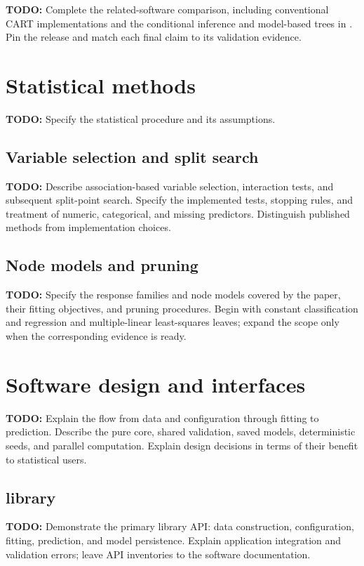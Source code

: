 \documentclass[article]{jss}
\newcommand{\todo}[1]{\textbf{TODO:} #1}
\begin{document}
\todo{Complete the related-software comparison, including conventional CART
implementations and the conditional inference and model-based trees in
\pkg{partykit} \citep{Hothorn+Zeileis:2015}. Pin the release and match each
final claim to its validation evidence.}

\section{Statistical methods}\label{sec:methods}

\todo{Specify the statistical procedure and its assumptions.}

\subsection{Variable selection and split search}
\todo{Describe association-based variable selection, interaction tests,
and subsequent split-point search. Specify the implemented tests, stopping
rules, and treatment of numeric, categorical, and missing predictors.
Distinguish published methods from implementation choices.}

\subsection{Node models and pruning}
\todo{Specify the response families and node models covered by the paper,
their fitting objectives, and pruning procedures. Begin with constant
classification and regression and multiple-linear least-squares leaves;
expand the scope only when the corresponding evidence is ready.}

\section{Software design and interfaces}\label{sec:software}

\todo{Explain the flow from data and configuration through fitting to
prediction. Describe the pure \proglang{Rust} core, shared validation,
saved models, deterministic seeds, and parallel computation. Explain
design decisions in terms of their benefit to statistical users.}

\subsection[Rust library]{ library}
\todo{Demonstrate the primary library API: data construction, configuration,
fitting, prediction, and model persistence. Explain application integration
and validation errors; leave API inventories to the software documentation.}
\end{document}
